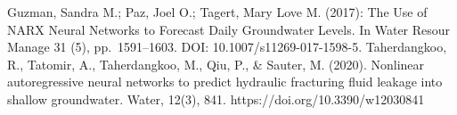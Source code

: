 \documentclass[10pt]{article}
\begin{document}
	
	
	\begin{thebibliography}{99} %
		Guzman, Sandra M.; Paz, Joel O.; Tagert, Mary Love M. (2017): The Use of NARX Neural Networks to Forecast Daily Groundwater Levels. In Water Resour Manage 31 (5), pp. 1591–1603. DOI: 10.1007/s11269-017-1598-5.
		Taherdangkoo, R., Tatomir, A., Taherdangkoo, M., Qiu, P., \& Sauter, M. (2020). Nonlinear autoregressive neural networks to predict hydraulic fracturing fluid leakage into shallow groundwater. Water, 12(3), 841. https://doi.org/10.3390/w12030841
	\end{thebibliography}
	
\end{document}
